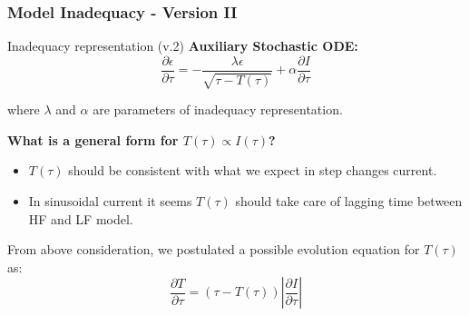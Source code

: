 \documentclass[10pt,xcolor=dvipsnames,compress]{beamer}
\begin{document}
\begin{frame}
\frametitle{Model Inadequacy - Version II}
\vfill


\begin{alertblock}{Inadequacy representation (v.2)}
\textbf{Auxiliary Stochastic ODE:}
\begin{equation*}
\frac{\partial\epsilon}{\partial\tau} = -\frac{\lambda\epsilon}{\sqrt{\tau - {T}(\tau)}} + \alpha \frac{\partial I}{\partial\tau}
\end{equation*}

where $\lambda$ and $\alpha$ are parameters of inadequacy representation. 
\end{alertblock}



\textbf{What is a general form for $T(\tau) \propto I(\tau)$?}

\begin{itemize}
\item $T(\tau)$ should be consistent with what we expect in step changes current.
\item In sinusoidal current it seems $T(\tau)$ should take care of lagging time between HF and LF model.
\end{itemize}


From above consideration, we postulated a possible evolution equation for ${T}(\tau)$ as: 
\begin{equation*}
\frac{\partial T}{\partial\tau} = (\tau - T(\tau)) \left| \frac{\partial I}{\partial\tau} \right|
\end{equation*}


\vfill
\end{frame}
\end{document}
